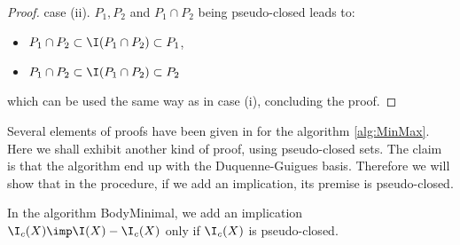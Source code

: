\begin{proof}
case (ii). $P_1, P_2$ and $P_1 \cap P_2$ being pseudo-closed leads to:
\begin{itemize}
	\item $P_1 \cap P_2 \subset \I(P_1 \cap P_2) \subset P_1$,
	\item $P_1 \cap P_2 \subset \I(P_1 \cap P_2) \subset P_2$
\end{itemize}
\noindent which can be used the same way as in case (i), concluding the proof.

\end{proof}

Several elements of proofs have been given in \cite{berczi_directed_2017} for
the algorithm \ref{alg:MinMax}. Here we shall exhibit another kind of proof, 
using pseudo-closed sets. The claim is that the algorithm end up with the 
Duquenne-Guigues basis. Therefore we will show that in the procedure, if we
add an implication, its premise is pseudo-closed.

\begin{proposition} In the algorithm BodyMinimal, we add an implication 
$\I_c(X) \imp \I(X) - \I_c(X)$ only if $\I_c(X)$ is pseudo-closed.
	
\end{proposition}

